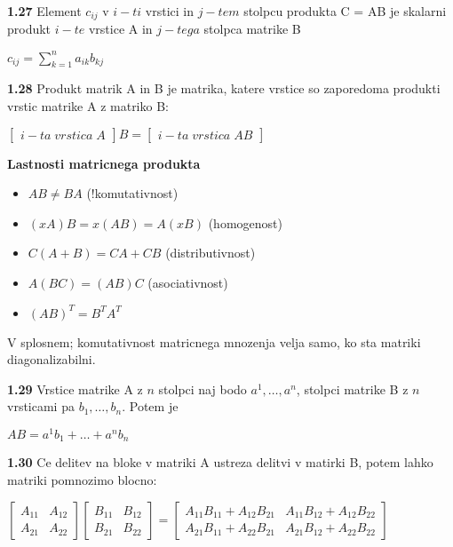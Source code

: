 \documentclass{article}
\begin{document}
\begin{multicols}{4}
\textbf{1.27} Element $c_{ij}$ v $i-ti$ vrstici in $j-tem$ stolpcu
produkta C = AB je skalarni produkt $i-te$ vrstice A in $j-tega$
stolpca matrike B
\begin{center}
    $c_{ij} =
    \sum_{k=1}^{n} a_{ik}b_{kj}
    $
\end{center}

\textbf{1.28} Produkt matrik A in B je matrika, katere vrstice
so zaporedoma produkti vrstic matrike A z matriko B:
\begin{center}
    $
    \begin{bmatrix}
        i-ta\; vrstica\; A
    \end{bmatrix}B =
    \begin{bmatrix}
        i-ta\; vrstica\; AB
    \end{bmatrix}
    $
\end{center}

\textbf{Lastnosti matricnega produkta}
\begin{itemize}
    \item $AB \neq BA$ (!komutativnost)
    \item $(xA)B = x(AB) = A(xB)$ (homogenost)
    \item $C(A + B) = CA + CB$ (distributivnost)
    \item $A(BC) = (AB)C$ (asociativnost)
    \item $(AB)^{T} = B^{T}A^{T}$
\end{itemize}
V splosnem; komutativnost matricnega mnozenja velja
samo, ko sta matriki diagonalizabilni.

\textbf{1.29} Vrstice matrike A z $n$ stolpci naj bodo
$a^{1}, \dots, a^{n}$, stolpci matrike B z $n$ vrsticami pa
$b_{1}, \dots, b_{n}$. Potem je
\begin{center}
    $AB = a^{1}b_{1} + \dots + a^{n}b_{n}$
\end{center}

\textbf{1.30} Ce delitev na bloke v matriki A ustreza delitvi v matirki B,
potem lahko matriki pomnozimo blocno:
\begin{center}
    $\begin{bmatrix}
        A_{11} & A_{12}\\
        A_{21} & A_{22}
    \end{bmatrix}
    \begin{bmatrix}
        B_{11} & B_{12}\\
        B_{21} & B_{22}
    \end{bmatrix} =
    \begin{bmatrix}
        A_{11}B_{11} + A_{12}B_{21} & A_{11}B_{12} + A_{12}B_{22}\\
        A_{21}B_{11} + A_{22}B_{21} & A_{21}B_{12} + A_{22}B_{22}
    \end{bmatrix}$
\end{center}


\end{multicols}
\end{document}
